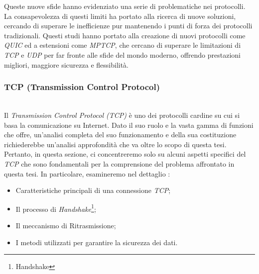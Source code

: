 \noindent Queste nuove sfide hanno evidenziato una serie di problematiche nei protocolli. La consapevolezza di questi limiti ha portato alla ricerca di nuove soluzioni, cercando di superare le inefficienze pur mantenendo i punti di forza dei protocolli tradizionali.
Questi studi hanno portato alla creazione di nuovi protocolli come \emph{QUIC} ed a estensioni come \emph{MPTCP}, che cercano di superare le limitazioni di \emph{TCP} e \emph{UDP} per far fronte alle sfide del mondo moderno, offrendo prestazioni migliori, maggiore sicurezza e flessibilità.
\subsubsection{TCP (Transmission Control Protocol)}
~\\
\indent Il \emph{Transmission Control Protocol (TCP)} è uno dei protocolli cardine su cui si basa la comunicazione su Internet. 
Dato il suo ruolo e la vasta gamma di funzioni che offre, un'analisi completa del suo funzionamento e della sua costituzione richiederebbe un'analisi approfondità che va oltre lo scopo di questa tesi.
Pertanto, in questa sezione, ci concentreremo solo su alcuni aspetti specifici del \emph{TCP} che sono fondamentali per la comprensione del problema affrontato in questa tesi. 
In particolare, esamineremo nel dettaglio :
\begin{itemize}
    \item Caratteristiche principali di una connessione \emph{TCP};
    
    \item Il processo di \emph{Handshake}\footnote{\gls{Handshake}};
    
    \item Il meccanismo di Ritrasmissione;
    
    \item I metodi utilizzati per garantire la sicurezza dei dati.
\end{itemize}

